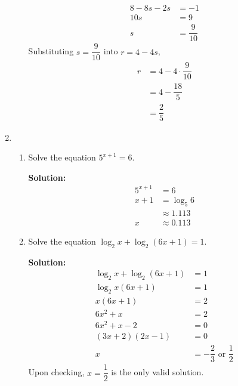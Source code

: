 \documentclass{report}
\newcommand{\sol}{\vspace{0.2cm}\textbf{Solution:}\vspace{0.2cm}}
\begin{document}
\begin{multicols*}{2}
\begin{enumerate}[leftmargin=*]
\begin{enumerate}
\begin{align*}
                            8 - 8s - 2s    & = -1            \\
                            10s            & = 9             \\
                            s              & = \dfrac{9}{10}
                        \end{align*}
                        Substituting $s = \dfrac{9}{10}$ into $r = 4 - 4s$,
                        \begin{align*}
                            r & = 4 - 4 \cdot \dfrac{9}{10} \\
                              & = 4 - \dfrac{18}{5}         \\
                              & = \dfrac{2}{5}
                        \end{align*}
              \end{enumerate}

        \item \begin{enumerate}
                  \item Solve the equation $5^{x+1}=6$.

                        \sol{}
                        \begin{align*}
                            5^{x+1} & = 6           \\
                            x + 1   & = \log_5 6    \\
                                    & \approx 1.113 \\
                            x       & \approx 0.113
                        \end{align*}

                        \newpage
                  \item Solve the equation $\log _2 x+\log _2(6 x+1)=1$.

                        \sol{}
                        \begin{align*}
                            \log_2 x + \log_2 (6x + 1) & = 1                                      \\
                            \log_2 x(6x + 1)           & = 1                                      \\
                            x(6x + 1)                  & = 2                                      \\
                            6x^2 + x                   & = 2                                      \\
                            6x^2 + x - 2               & = 0                                      \\
                            (3x + 2)(2x - 1)           & = 0                                      \\
                            x                          & = -\dfrac{2}{3} \text{ or } \dfrac{1}{2}
                        \end{align*}
                        Upon checking, $x = \dfrac{1}{2}$ is the only valid solution.


\end{enumerate}
\end{enumerate}
\end{multicols*}
\end{document}
